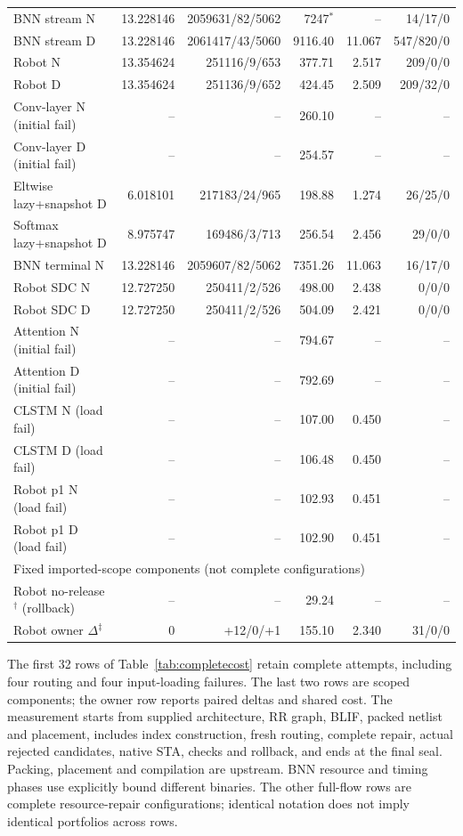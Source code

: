 \documentclass[conference,10pt]{IEEEtran}
\begin{document}
\begin{table}[t]
\begin{tabular}{lrrrrr}
BNN stream N&13.228146&2059631/82/5062&7247$^{*}$&--&14/17/0\\
BNN stream D&13.228146&2061417/43/5060&9116.40&11.067&547/820/0\\
Robot N&13.354624&251116/9/653&377.71&2.517&209/0/0\\
Robot D&13.354624&251136/9/652&424.45&2.509&209/32/0\\
Conv-layer N (initial fail)&--&--&260.10&--&--\\
Conv-layer D (initial fail)&--&--&254.57&--&--\\
Eltwise lazy+snapshot D&6.018101&217183/24/965&198.88&1.274&26/25/0\\
Softmax lazy+snapshot D&8.975747&169486/3/713&256.54&2.456&29/0/0\\\hline
BNN terminal N&13.228146&2059607/82/5062&7351.26&11.063&16/17/0\\
Robot SDC N&12.727250&250411/2/526&498.00&2.438&0/0/0\\
Robot SDC D&12.727250&250411/2/526&504.09&2.421&0/0/0\\
Attention N (initial fail)&--&--&794.67&--&--\\
Attention D (initial fail)&--&--&792.69&--&--\\\hline
CLSTM N (load fail)&--&--&107.00&0.450&--\\
CLSTM D (load fail)&--&--&106.48&0.450&--\\
Robot p1 N (load fail)&--&--&102.93&0.451&--\\
Robot p1 D (load fail)&--&--&102.90&0.451&--\\\hline
\multicolumn{6}{l}{Fixed imported-scope components (not complete configurations)}\\

Robot no-release$^{\dagger}$ (rollback)&--&--&29.24&--&--\\
Robot owner $\Delta^{\ddagger}$&0&+12/0/+1&155.10&2.340&31/0/0\\\hline
\end{tabular}
\end{table}


The first 32 rows of Table~\ref{tab:completecost} retain complete attempts, including four routing and four input-loading failures. The last two rows are scoped components; the owner row reports paired deltas and shared cost. The measurement starts from supplied architecture, RR graph, BLIF, packed netlist and placement, includes index construction, fresh routing, complete repair, actual rejected candidates, native STA, checks and rollback, and ends at the final seal. Packing, placement and compilation are upstream. BNN resource and timing phases use explicitly bound different binaries. The other full-flow rows are complete resource-repair configurations; identical notation does not imply identical portfolios across rows.
\end{document}
